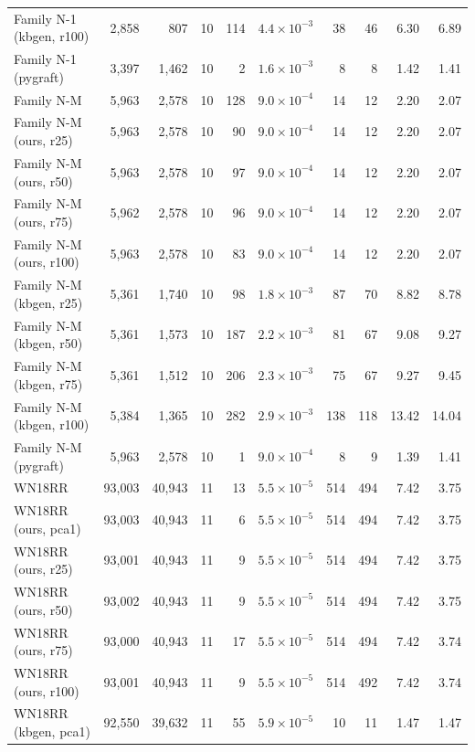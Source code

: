 \begin{tabular}{lrrrrrrrrr}
Family N-1 (kbgen, r100) & 2{,}858 & 807 & 10 & 114 & $4.4\times10^{-3}$ & 38 & 46 & 6.30 & 6.89 \\
Family N-1 (pygraft) & 3{,}397 & 1{,}462 & 10 & 2 & $1.6\times10^{-3}$ & 8 & 8 & 1.42 & 1.41 \\
\midrule
Family N-M & 5{,}963 & 2{,}578 & 10 & 128 & $9.0\times10^{-4}$ & 14 & 12 & 2.20 & 2.07 \\
Family N-M (ours, r25) & 5{,}963 & 2{,}578 & 10 & 90 & $9.0\times10^{-4}$ & 14 & 12 & 2.20 & 2.07 \\
Family N-M (ours, r50) & 5{,}963 & 2{,}578 & 10 & 97 & $9.0\times10^{-4}$ & 14 & 12 & 2.20 & 2.07 \\
Family N-M (ours, r75) & 5{,}962 & 2{,}578 & 10 & 96 & $9.0\times10^{-4}$ & 14 & 12 & 2.20 & 2.07 \\
Family N-M (ours, r100) & 5{,}963 & 2{,}578 & 10 & 83 & $9.0\times10^{-4}$ & 14 & 12 & 2.20 & 2.07 \\
Family N-M (kbgen, r25) & 5{,}361 & 1{,}740 & 10 & 98 & $1.8\times10^{-3}$ & 87 & 70 & 8.82 & 8.78 \\
Family N-M (kbgen, r50) & 5{,}361 & 1{,}573 & 10 & 187 & $2.2\times10^{-3}$ & 81 & 67 & 9.08 & 9.27 \\
Family N-M (kbgen, r75) & 5{,}361 & 1{,}512 & 10 & 206 & $2.3\times10^{-3}$ & 75 & 67 & 9.27 & 9.45 \\
Family N-M (kbgen, r100) & 5{,}384 & 1{,}365 & 10 & 282 & $2.9\times10^{-3}$ & 138 & 118 & 13.42 & 14.04 \\
Family N-M (pygraft) & 5{,}963 & 2{,}578 & 10 & 1 & $9.0\times10^{-4}$ & 8 & 9 & 1.39 & 1.41 \\
\midrule
WN18RR & 93{,}003 & 40{,}943 & 11 & 13 & $5.5\times10^{-5}$ & 514 & 494 & 7.42 & 3.75 \\
WN18RR (ours, pca1) & 93{,}003 & 40{,}943 & 11 & 6 & $5.5\times10^{-5}$ & 514 & 494 & 7.42 & 3.75 \\
WN18RR (ours, r25) & 93{,}001 & 40{,}943 & 11 & 9 & $5.5\times10^{-5}$ & 514 & 494 & 7.42 & 3.75 \\
WN18RR (ours, r50) & 93{,}002 & 40{,}943 & 11 & 9 & $5.5\times10^{-5}$ & 514 & 494 & 7.42 & 3.75 \\
WN18RR (ours, r75) & 93{,}000 & 40{,}943 & 11 & 17 & $5.5\times10^{-5}$ & 514 & 494 & 7.42 & 3.74 \\
WN18RR (ours, r100) & 93{,}001 & 40{,}943 & 11 & 9 & $5.5\times10^{-5}$ & 514 & 492 & 7.42 & 3.74 \\
WN18RR (kbgen, pca1) & 92{,}550 & 39{,}632 & 11 & 55 & $5.9\times10^{-5}$ & 10 & 11 & 1.47 & 1.47 \\

\end{tabular}
